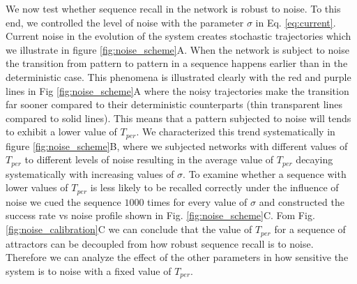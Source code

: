 \documentclass[10pt,a4paper]{article}
\begin{document}
We now test whether sequence recall in the network is robust to noise. To this end, we controlled the level of noise with the parameter $\sigma$ in Eq. \ref{eq:current}. Current noise in the evolution of the system creates stochastic trajectories which we illustrate in figure \ref{fig:noise_scheme}A. When the network is subject to noise the transition from pattern to pattern in a sequence happens earlier than in the deterministic case. This phenomena is illustrated clearly with the red and purple lines in Fig \ref{fig:noise_scheme}A where the noisy trajectories make the transition far sooner compared to their deterministic counterparts (thin transparent lines compared to solid lines). This means that a pattern subjected to noise will tends to exhibit a lower value of $T_{per}$. We characterized this trend systematically in figure \ref{fig:noise_scheme}B, where we subjected networks with different values of $T_{per}$ to different levels of noise resulting in the average value of $T_{per}$ decaying systematically with increasing values of $\sigma$. To examine whether a sequence with lower values of $T_{per}$ is less likely to be recalled correctly under the influence of noise we cued the sequence $1000$ times for every value of $\sigma$ and constructed the success rate vs noise profile shown in Fig. \ref{fig:noise_scheme}C. Fom Fig. \ref{fig:noise_calibration}C we can conclude that the value of $T_{per}$ for a sequence of attractors can be decoupled from how robust sequence recall is to noise. Therefore we can analyze the effect of the other parameters in how sensitive the system is to noise with a fixed value of $T_{per}$.
\end{document}
